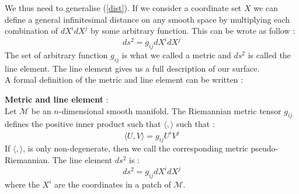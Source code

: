 \documentclass[a4paper,12pt]{article}
\theoremstyle{definition}
\begin{document}
We thus need to generalise (\ref{dist}).
If we consider a coordinate set $X$ we can define a general infinitesimal distance on any smooth space by multiplying each combination of $dX^idX^j$ by some arbitrary function.
This can be wrote as follow :
\begin{equation*}
	ds^2=g_{ij}dX^idX^j
\end{equation*}
The set of arbitrary function $g_{ij}$ is what we called a metric and $ds^2$ is called the line element.
The line element gives us a full description of our surface.\\
A formal definition of the metric and line element can be written :
\begin{definition}
	\textbf{Metric and line element} :\\
	Let $\mathcal{M}$ be an $n$-dimensional smooth manifold.
	The Riemannian metric tensor $g_{ij}$ defines the positive inner product such that $\langle , \rangle$ such that : 
	\begin{equation*}
		\langle U , V \rangle = g_{ij}U^iV^j
	\end{equation*}
	If $\langle , \rangle$, is only non-degenerate, then we call the corresponding metric pseudo-Riemannian.
	The line element $ds^2$ is :
	\begin{equation*}
		ds^2=g_{ij}dX^idX^j
	\end{equation*}
	where the $X^i$ are the coordinates in a patch of $\mathcal{M}$.
\end{definition}
\end{document}
